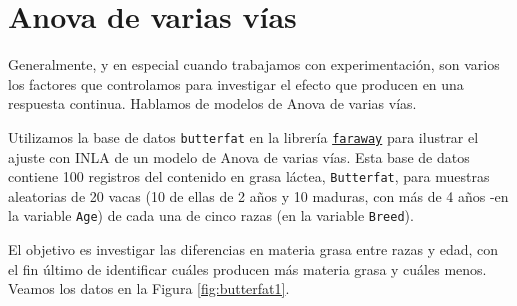 \documentclass[
]{book}
\newenvironment{Shaded}{\begin{snugshade}}{\end{snugshade}}
\newcommand{\AttributeTok}[1]{\textcolor[rgb]{0.77,0.63,0.00}{#1}}
\newcommand{\CommentTok}[1]{\textcolor[rgb]{0.56,0.35,0.01}{\textit{#1}}}
\newcommand{\DecValTok}[1]{\textcolor[rgb]{0.00,0.00,0.81}{#1}}
\newcommand{\FunctionTok}[1]{\textcolor[rgb]{0.00,0.00,0.00}{#1}}
\newcommand{\NormalTok}[1]{#1}
\newcommand{\SpecialCharTok}[1]{\textcolor[rgb]{0.00,0.00,0.00}{#1}}
\newcommand{\StringTok}[1]{\textcolor[rgb]{0.31,0.60,0.02}{#1}}
\begin{document}
\hypertarget{anova-de-varias-vuxedas}{%
\section{Anova de varias vías}\label{anova-de-varias-vuxedas}}

Generalmente, y en especial cuando trabajamos con experimentación, son varios los factores que controlamos para investigar el efecto que producen en una respuesta continua. Hablamos de modelos de Anova de varias vías.

Utilizamos la base de datos \texttt{butterfat} en la librería \href{https://cran.r-project.org/web/packages/faraway/faraway.pdf}{\texttt{faraway}} para ilustrar el ajuste con INLA de un modelo de Anova de varias vías. Esta base de datos contiene 100 registros del contenido en grasa láctea, \texttt{Butterfat}, para muestras aleatorias de 20 vacas (10 de ellas de 2 años y 10 maduras, con más de 4 años -en la variable \texttt{Age}) de cada una de cinco razas (en la variable \texttt{Breed}).

El objetivo es investigar las diferencias en materia grasa entre razas y edad, con el fin último de identificar cuáles producen más materia grasa y cuáles menos. Veamos los datos en la Figura \ref{fig:butterfat1}.

\begin{Shaded}
\end{Shaded}
\end{document}
